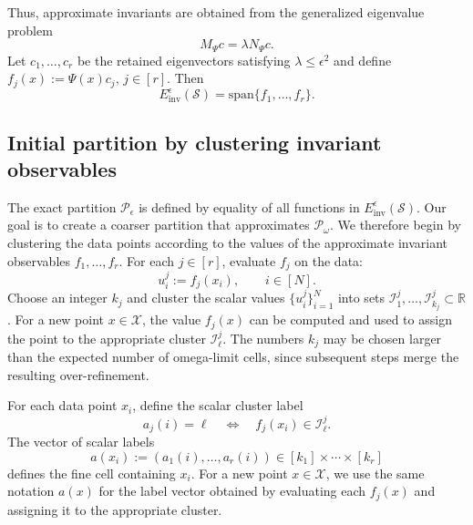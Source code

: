\documentclass[letterpaper, 10 pt, conference]{ieeeconf}
\newcommand{\Ic}{\mathcal{I}}
\newcommand{\Pc}{\mathcal{P}}
\newcommand{\Sc}{\mathcal{S}}
\newcommand{\Xc}{\mathcal{X}}
\newcommand{\R}{\mathbb{R}}
\begin{document}
Thus, approximate invariants are obtained from the generalized eigenvalue problem
\begin{equation}
    M_\Psi c = \lambda N_\Psi c.
    \label{eq:empirical_GEP}
\end{equation}
Let $c_1,\ldots,c_r$ be the retained eigenvectors satisfying $\lambda\leq \epsilon^2$ and define $f_j(x):=\Psi(x)c_j, \, j\in[r]$. Then 
\begin{equation}
    E_{\text{inv}}^\epsilon(\Sc) = \text{span}\{f_1,\ldots,f_r\}.
\end{equation}

\subsection{Initial partition by clustering invariant observables}

The exact partition $\Pc_\epsilon$ is defined by equality of all functions in $E_{\text{inv}}^\epsilon(\Sc)$. Our goal is to create a coarser partition that approximates $\Pc_\omega$. We therefore begin by clustering the data points according to the values of the approximate invariant observables $f_1,\ldots,f_r$. For each $j\in[r]$, evaluate $f_j$ on the data:
\begin{equation}
    u_i^j:=f_j(x_i),\qquad i\in[N].
\end{equation}
Choose an integer $k_j$ and cluster the scalar values $\{u_i^j\}_{i=1}^N$ into sets $\Ic_1^j,\ldots,\Ic_{k_j}^j\subset\R$. For a new point $x \in \Xc$, the value $f_j(x)$ can be computed and used to assign the point to the appropriate cluster $\Ic_\ell^j$. The numbers $k_j$ may be chosen larger than the expected number of omega-limit cells, since subsequent steps merge the resulting over-refinement. 

For each data point $x_i$, define the scalar cluster label
\begin{equation}
    a_j(i)=\ell
    \quad\Longleftrightarrow\quad
    f_j(x_i)\in\Ic_\ell^j.
\end{equation}
The vector of scalar labels
\begin{equation}
    a(x_i):=(a_1(i),\ldots,a_r(i))
    \in [k_1]\times\cdots\times[k_r]
\end{equation}
defines the fine cell containing $x_i$. For a new point $x \in \Xc$, we use the same notation $a(x)$ for the label vector obtained by evaluating each $f_j(x)$ and assigning it to the appropriate cluster.
\end{document}
